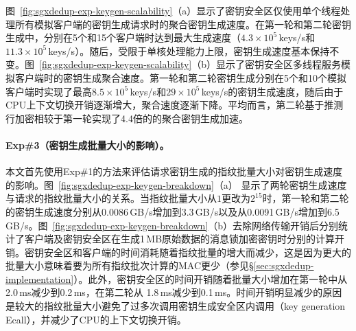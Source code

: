 图~\ref{fig:sgxdedup-exp-keygen-scalability}（a）显示了密钥安全区仅使用单个线程处理所有模拟客户端的密钥生成请求时的聚合密钥生成速度。在第一轮和第二轮密钥生成中，\sysnameS 分别在5个和15个客户端时达到最大生成速度（$4.3\times 10^5$\,keys/s和$11.3\times 10^5$\,keys/s）。随后，受限于单核处理能力上限，密钥生成速度基本保持不变。图~\ref{fig:sgxdedup-exp-keygen-scalability}（b）显示了密钥安全区多线程服务模拟客户端时的密钥生成聚合速度。第一轮和第二轮密钥生成分别在5个和10个模拟客户端时实现了最高$8.5\times 10^5$\,keys/s和$29\times 10^5$\,keys/s的密钥生成速度，随后由于CPU上下文切换开销逐渐增大，聚合速度逐渐下降。平均而言，第二轮基于推测行加密相较于第一轮实现了4.4倍的的聚合密钥生成加速。

\paragraph*{Exp\#3（密钥生成批量大小的影响）。}

本文首先使用Exp\#1的方法来评估请求密钥生成的指纹批量大小对密钥生成速度的影响。图~\ref{fig:sgxdedup-exp-keygen-breakdown}（a） 显示了两轮密钥生成速度与请求的指纹批量大小的关系。当指纹批量大小从$1$更改为$2^{15}$时，第一轮和第二轮的密钥生成速度分别从0.0086\,GB/s增加到3.3\,GB/s以及从0.0091\,GB/s增加到6.5\,GB/s。图~\ref{fig:sgxdedup-exp-keygen-breakdown}（b）去除网络传输开销后分别统计了客户端及密钥安全区在生成1\,MB原始数据的消息锁加密密钥时分别的计算开销。密钥安全区和客户端的时间消耗随着指纹批量的增大而减少，这是因为更大的批量大小意味着要为所有指纹批次计算的MAC更少（参见\S\ref{sec:sgxdedup-implementation}）。此外，密钥安全区的时间开销随着批量大小增加在第一轮中从2.0\,ms减少到0.2\,ms，在第二轮从 1.8\,ms减少到0.1\,ms。时间开销明显减少的原因是较大的指纹批量大小避免了过多次调用密钥生成安全区内调用（key generation Ecall），并减少了CPU的上下文切换开销。

